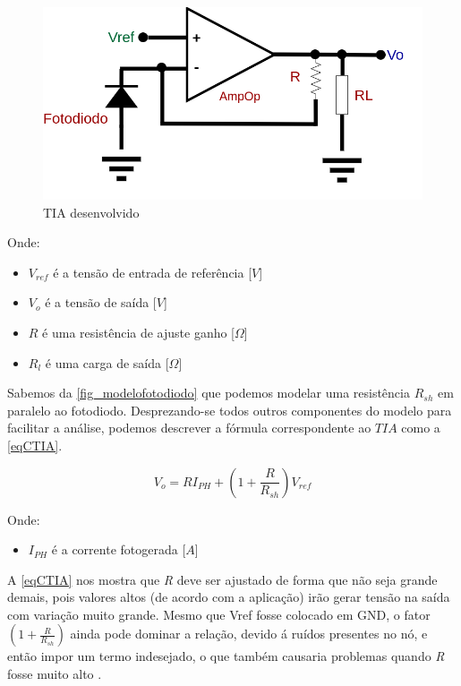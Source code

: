 \begin{figure}[!h]
	\caption{\label{fig_TIA}TIA desenvolvido}
	\begin{center}
	    \includegraphics[scale=0.3]{Circuitos/TIA.png}
	\end{center}
\end{figure}

Onde:

\begin{itemize}
    \item $V_{ref}$ \'e a tensão de entrada de referência [$V$]
    \item $V_o$ \'e a tensão de sa\'ida [$V$]
    \item $R$ \'e uma resist\^encia de ajuste ganho [$\Omega$]
    \item $R_l$ \'e uma carga de sa\'ida [$\Omega$]
\end{itemize}

Sabemos da \autoref{fig_modelofotodiodo} que podemos modelar uma resist\^encia $R_{sh}$ em paralelo ao fotodiodo. Desprezando-se todos outros componentes do modelo para facilitar a an\'alise, podemos descrever a f\'ormula correspondente ao $TIA$ como a \autoref{eqCTIA}.

\begin{equation}
    \label{eqCTIA}
    V_o = RI_{PH} + (1+\frac{R}{R_{sh}})V_{ref}
\end{equation}

Onde:
\begin{itemize}
    \item $I_{PH}$ \'e a corrente fotogerada [$A$]
\end{itemize}

A \autoref{eqCTIA} nos mostra que \textit{R} deve ser ajustado de forma que não seja grande demais, pois valores altos (de acordo com a aplicação) irão gerar tensão na sa\'ida com variação muito grande. Mesmo que Vref fosse colocado em GND, o fator $(1+\frac{R}{R_{sh}})$ ainda pode dominar a relação, devido \'a ruídos presentes no nó, e então impor um termo indesejado, o que também causaria problemas quando \textit{R} fosse muito alto \cite{hamamatsu}.

